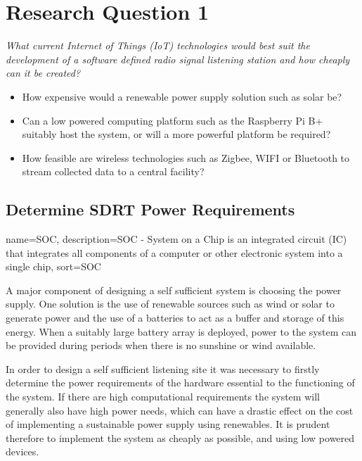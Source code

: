 \newpage
\chapter*{Research Question 1}

\textit{What current Internet of Things (\gls{IoT}) technologies would best suit the development of a software defined radio signal listening station and how cheaply can it be created?}

\begin{itemize}
	\item How expensive would a renewable power supply solution such as solar be?
	\item Can a low powered computing platform such as the Raspberry Pi B+ suitably host the system, or will a more powerful platform be required?
	\item How feasible are wireless technologies such as Zigbee, WIFI or Bluetooth to stream collected data to a central facility?
\end{itemize}


\section*{Determine SDRT Power Requirements}

{
	name={SOC},
	description={SOC - System on a Chip is an integrated circuit (IC) that integrates all components of a computer or other electronic system into a single chip},
	sort=SOC
}

A major component of designing a self sufficient system is choosing the power supply. One solution is the use of renewable sources such as wind or solar to generate power and the use of a batteries to act as a buffer and storage of this energy. When a suitably large battery array is deployed, power to the system can be provided during periods when there is no sunshine or wind available.

In order to design a self sufficient listening site it was necessary to firstly determine the power requirements of the hardware essential to the functioning of the system. If there are high computational requirements the system will generally also have high power needs, which can have a drastic effect on the cost of implementing a sustainable power supply using renewables. It is prudent therefore to implement the system as cheaply as possible, and using low powered devices.

